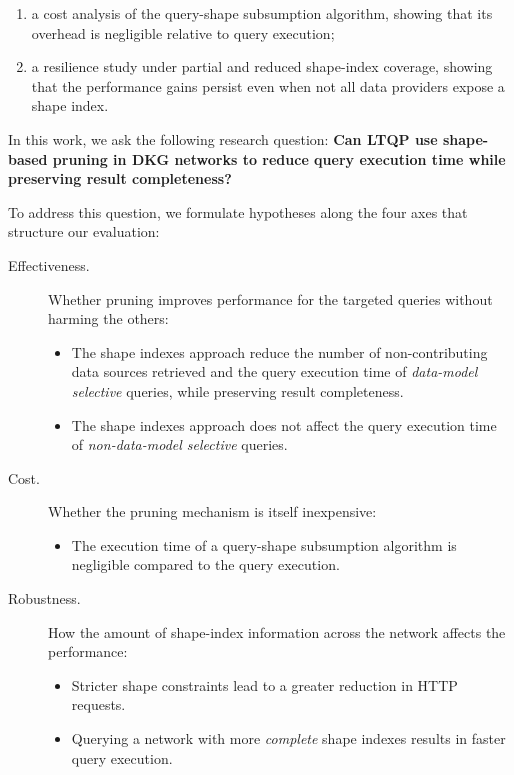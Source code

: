 \begin{Rboth}
\begin{description}
\begin{enumerate}[label=(\roman*)]
			      \item a cost analysis of the query-shape subsumption algorithm, showing that its overhead is negligible relative to query execution;
			      \item a resilience study under partial and reduced shape-index coverage, showing that the performance gains persist even when not all data providers expose a shape index.
		      \end{enumerate}
	\end{description}
\end{Rboth}

In this work, we ask the following research question:
\textbf{Can \ac{LTQP} use shape-based pruning in \ac{DKG} networks to reduce query execution time while preserving result completeness?}
\begin{Rone}
	To address this question, we formulate hypotheses along the four axes that structure our evaluation:
	\begin{description}
		\item[Effectiveness.] Whether pruning improves performance for the targeted queries without harming the others:
		      \begin{itemize}
			      \item[\textbf{H1}] The shape indexes approach reduce the number of non-contributing data sources retrieved and the query execution time of \emph{data-model selective} queries, while preserving result completeness.
			      \item[\textbf{H2}] The shape indexes approach does not affect the query execution time of \emph{non-data-model selective} queries.
		      \end{itemize}
		\item[Cost.] Whether the pruning mechanism is itself inexpensive:
		      \begin{itemize}
			      \item[\textbf{H3}] The execution time of a query-shape subsumption algorithm is negligible compared to the query execution.
		      \end{itemize}
		\item[Robustness.] How the amount of shape-index information across the network affects the performance:
		      \begin{itemize}
			      \item[\textbf{H4}] Stricter shape constraints lead to a greater reduction in \ac{HTTP} requests.
			      \item[\textbf{H5}] Querying a network with more \emph{complete} shape indexes results in faster query execution.

\end{itemize}
\end{description}
\end{Rone}
